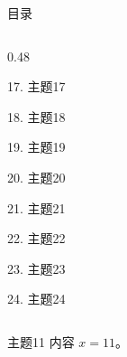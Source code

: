 \documentclass[aspectratio=169,10pt,fontset=fandol]{ctexbeamer}
\begin{document}
\begin{frame}[t,fragile]{目录}
\begin{columns}[T,onlytextwidth]
\begin{column}{0.48\textwidth}
{\color{gray!40}\small 17. 主题17\par}\vspace{0.22em}
{\color{gray!40}\small 18. 主题18\par}\vspace{0.22em}
{\color{gray!40}\small 19. 主题19\par}\vspace{0.22em}
{\color{gray!40}\small 20. 主题20\par}\vspace{0.22em}
{\color{gray!40}\small 21. 主题21\par}\vspace{0.22em}
{\color{gray!40}\small 22. 主题22\par}\vspace{0.22em}
{\color{gray!40}\small 23. 主题23\par}\vspace{0.22em}
{\color{gray!40}\small 24. 主题24\par}\vspace{0.22em}
\end{column}
\end{columns}
\end{frame}
\begin{frame}[t,fragile]{主题11}
\normalsize
{\normalsize
内容 $x=11$。
}
\end{frame}
\end{document}
